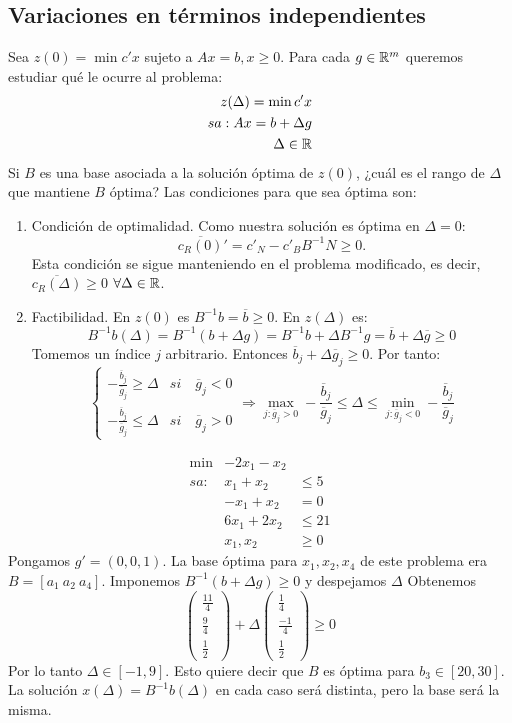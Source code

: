 \documentclass[PM.tex]{subfiles}
\begin{document}
\subsection{Variaciones en términos independientes}

Sea $z(0)= \min c'x$ sujeto a $Ax=b, x\geq 0$. Para cada $g\in\mathbb{R}^m$ queremos estudiar qué le ocurre al problema:
\begin{align*}
z(\Delta)=\min c'x\\
sa: Ax=b+\Delta g\\
\Delta\in\mathbb{R}
\end{align*}
Si $B$ es una base asociada a la solución óptima de $z(0)$, ¿cuál es el rango de $\Delta$ que mantiene $B$ óptima? Las condiciones para que sea óptima son:
\begin{enumerate}
\item Condición de optimalidad. Como nuestra solución es óptima en $\Delta =0$: \[\overline{c_R(0)}'=c'_N-c'_B B^{-1}N\geq 0.\]
Esta condición se sigue manteniendo en el problema modificado, es decir, $\overline{c_R(\Delta)}\geq 0$ $\forall \Delta \in \mathbb{R}$.
\item Factibilidad. En $z(0)$ es $B^{-1}b=\overline{b}\geq 0$. En $z(\Delta)$ es:
\[B^{-1}b(\Delta)=B^{-1}(b+\Delta  g)=B^{-1}b+\Delta B^{-1}g=\overline{b}+\Delta\overline{g}\geq 0\]
Tomemos un índice $j$ arbitrario. Entonces $\overline{b}_j+\Delta\overline{g}_j\geq 0$. Por tanto:
\[
\begin{cases}
-\frac{\overline{b}_j}{\overline{g}_j} \geq \Delta & si \quad \overline{g}_j <0\\
-\frac{\overline{b}_j}{\overline{g}_j} \leq \Delta & si \quad \overline{g}_j >0
\end{cases}
\Rightarrow \max_{j:\overline{g}_j >0}-\frac{\overline{b}_j}{\overline{g}_j} \leq \Delta \leq \min_{j:\overline{g}_j <0}-\frac{\overline{b}_j}{\overline{g}_j}\]
\end{enumerate}
\begin{example}
\begin{align*}
\min & -2x_1-x_2 &\\
sa: & x_1+x_2 &\leq 5\\
    & -x_1+x_2 & =0\\
    & 6x_1+2x_2 & \leq 21\\
    & x_1,x_2 & \geq 0
\end{align*}
Pongamos $g'=(0,0,1)$. La base óptima para $x_1,x_2,x_4$ de este problema era $B=[a_1\ a_2\ a_4]$. Imponemos $B^{-1}(b+\Delta g)\geq 0$ y despejamos $\Delta$ Obtenemos
\[
\begin{pmatrix}
\frac{11}{4}\\
\frac{9}{4}\\
\frac{1}{2}
\end{pmatrix}+\Delta\begin{pmatrix}
\frac{1}{4}\\
\frac{-1}{4}\\
\frac{1}{2}
\end{pmatrix}\geq 0
\]
Por lo tanto $\Delta\in [-1,9]$. Esto quiere decir que $B$ es óptima para $b_3\in[20,30]$. La solución $x(\Delta)=B^{-1}b(\Delta)$ en cada caso será distinta, pero la base será la misma.
\end{example}
\end{document}
